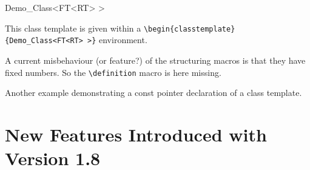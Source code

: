 \documentclass[12pt]{article}
\begin{document}
\begin{ccClassTemplate}{Demo_Class<FT<RT> >}

This class template is given within a
\verb"\be"\verb"gin{classtemplate}{Demo_Class<FT<RT> >}" environment.

\ccCreation

A current misbehaviour (or feature?) of the structuring macros is that
they have fixed numbers. So the \verb"\"\verb"definition" macro is here
missing.




\ccOperations
\ccSetTwoOfThreeColumns{4.3cm}{2.3cm}



Another example demonstrating a const pointer declaration of a 
class template.



\end{ccClassTemplate}

\section{New Features Introduced with Version 1.8}
\end{document}
